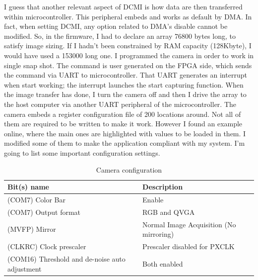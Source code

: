 I guess that another relevant aspect of DCMI is how data are then transferred within microcontroller. This peripheral embeds and works as default by DMA. In fact, when setting DCMI, any option related to DMA's disable cannot be modified. So, in the firmware, I had to declare an array 76800 bytes long, to satisfy image sizing. If I hadn't been constrained by RAM capacity (128Kbyte), I would have used a 153000 long one.
\newline
\newline
I programmed the camera in order to work in single snap shot. The command is user generated on the FPGA side, which sends the command via UART to microcontroller. That UART generates an interrupt when start working; the interrupt launches the start capturing function. When the image transfer has done, I turn the camera off and then I drive the array to the host computer via another UART peripheral of the microcontroller. 
\newline
\newline
The camera embeds a register configuration file of 200 locations around. Not all of them are required to be written to make it work. However I found an example online, where the main ones are highlighted with values to be loaded in them. I modified some of them to make the application compliant with my system. I'm going to list some important configuration settings.

\begin{table}[H]
\centering
\begin{tabular}{p{}p{}}

\textbf{Bit(s) name}&\textbf{Description}\\ \hline
(COM7) Color Bar & Enable\\
(COM7) Output format & RGB and QVGA\\
(MVFP) Mirror	& Normal Image Acquisition (No mirroring)\\
(CLKRC) Clock prescaler & Prescaler disabled for PXCLK\\
(COM16) Threshold and de-noise auto adjustment & Both enabled\\
\hline
\end{tabular}
\caption{Camera configuration}
\end{table}

